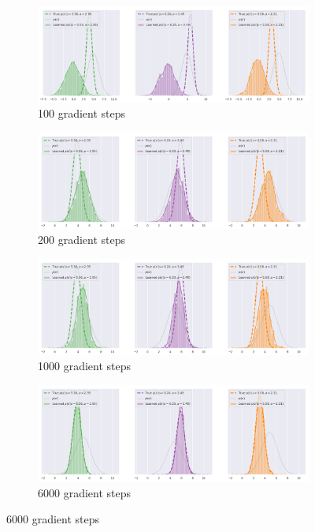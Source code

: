 \documentclass{kththesis}
\begin{document}
\begin{figure}
\centering
\captionsetup{size=footnotesize}
\begin{subfigure}{\linewidth}
  \centering
  \includegraphics[width=1.0\linewidth]{img/trivariate/trivariate-epoch100}
  \caption{100 gradient steps}
  \label{fig_3_parameters_0}
\end{subfigure}
\begin{subfigure}{\textwidth}
  \centering
  \includegraphics[width=1.0\linewidth]{img/trivariate/trivariate-epoch200}
  \caption{200 gradient steps}
\end{subfigure}
\begin{subfigure}{\textwidth}
  \centering
  \includegraphics[width=1.0\linewidth]{img/trivariate/trivariate-epoch1000}
  \caption{1000 gradient steps}
\end{subfigure}
\begin{subfigure}{\textwidth}
  \centering
  \includegraphics[width=1.0\linewidth]{img/trivariate/trivariate-epoch6000}
  \caption{6000 gradient steps}
\end{subfigure}


\end{figure}
\end{document}
